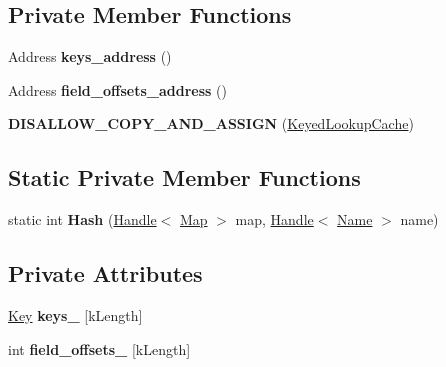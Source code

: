 \subsection*{Private Member Functions}
\begin{DoxyCompactItemize}
\item 
Address {\bfseries keys\+\_\+address} ()\hypertarget{classv8_1_1internal_1_1_keyed_lookup_cache_a4a17f7114245a2b383222b016443da76}{}\label{classv8_1_1internal_1_1_keyed_lookup_cache_a4a17f7114245a2b383222b016443da76}

\item 
Address {\bfseries field\+\_\+offsets\+\_\+address} ()\hypertarget{classv8_1_1internal_1_1_keyed_lookup_cache_a336f7939d8561afd65798bd1fff1ad2a}{}\label{classv8_1_1internal_1_1_keyed_lookup_cache_a336f7939d8561afd65798bd1fff1ad2a}

\item 
{\bfseries D\+I\+S\+A\+L\+L\+O\+W\+\_\+\+C\+O\+P\+Y\+\_\+\+A\+N\+D\+\_\+\+A\+S\+S\+I\+GN} (\hyperlink{classv8_1_1internal_1_1_keyed_lookup_cache}{Keyed\+Lookup\+Cache})\hypertarget{classv8_1_1internal_1_1_keyed_lookup_cache_a29c82e1aa14b2761537a2e5d34c93761}{}\label{classv8_1_1internal_1_1_keyed_lookup_cache_a29c82e1aa14b2761537a2e5d34c93761}

\end{DoxyCompactItemize}
\subsection*{Static Private Member Functions}
\begin{DoxyCompactItemize}
\item 
static int {\bfseries Hash} (\hyperlink{classv8_1_1internal_1_1_handle}{Handle}$<$ \hyperlink{classv8_1_1internal_1_1_map}{Map} $>$ map, \hyperlink{classv8_1_1internal_1_1_handle}{Handle}$<$ \hyperlink{classv8_1_1internal_1_1_name}{Name} $>$ name)\hypertarget{classv8_1_1internal_1_1_keyed_lookup_cache_a8f8d49512dbbb3d6b78449537983b2bf}{}\label{classv8_1_1internal_1_1_keyed_lookup_cache_a8f8d49512dbbb3d6b78449537983b2bf}

\end{DoxyCompactItemize}
\subsection*{Private Attributes}
\begin{DoxyCompactItemize}
\item 
\hyperlink{structv8_1_1internal_1_1_keyed_lookup_cache_1_1_key}{Key} {\bfseries keys\+\_\+} \mbox{[}k\+Length\mbox{]}\hypertarget{classv8_1_1internal_1_1_keyed_lookup_cache_ac06b6aa96ae183442111abbb65440e35}{}\label{classv8_1_1internal_1_1_keyed_lookup_cache_ac06b6aa96ae183442111abbb65440e35}

\item 
int {\bfseries field\+\_\+offsets\+\_\+} \mbox{[}k\+Length\mbox{]}\hypertarget{classv8_1_1internal_1_1_keyed_lookup_cache_ae705017d261c489a82421aba542ba839}{}\label{classv8_1_1internal_1_1_keyed_lookup_cache_ae705017d261c489a82421aba542ba839}

\end{DoxyCompactItemize}
